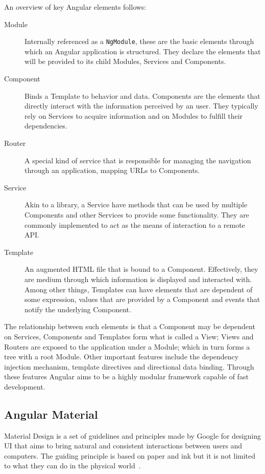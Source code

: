 An overview of key Angular elements follows:
\begin{description}
\item[Module] Internally referenced as a \texttt{NgModule}, these are the basic elements through which an Angular application is structured\cite{angularmodule}. They declare the elements that will be provided to its child Modules, Services and Components.
\item[Component] Binds a Template to behavior and data. Components are the elements that directly interact with the information perceived by an user. They typically rely on Services to acquire information and on Modules to fulfill their dependencies. 
\item[Router] A special kind of service that is responsible for managing the navigation through an application, mapping \gls{URL}s to Components.
\item[Service] Akin to a library, a Service have methods that can be used by multiple Components and other Services to provide some functionality. They are commonly implemented to act as the means of interaction to a remote \gls{API}.
\item[Template] An augmented \gls{HTML} file that is bound to a Component. Effectively, they are medium through which information is displayed and interacted with. Among other things, Templates can have elements that are dependent of some expression, values that are provided by a Component and events that notify the underlying Component.
\end{description}

The relationship between such elements is that a Component may be dependent on Services, Components and Templates form what is called a View; Views and Routers are exposed to the application under a Module; which in turn forms a tree with a root Module.
Other important features include the dependency injection mechanism, template directives and directional data binding. Through these features Angular aims to be a highly modular framework capable of fast development.

\subsection{Angular Material}
Material Design is a set of guidelines and principles made by Google for designing \gls{UI} that aims to bring natural and consistent interactions between users and computers. The guiding principle is based on paper and ink but it is not limited to what they can do in the physical world~\cite{materialdesign}.

